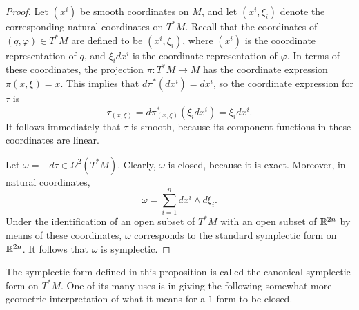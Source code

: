 \begin{proof}
Let $(x^i)$ be smooth coordinates on $M$, and let $(x^i,\xi_i)$ denote the corresponding natural coordinates on $T^*M$. Recall that the coordinates of $(q,\varphi)\in T^*M$ are defined to be $(x^i,\xi_i)$, where $(x^i)$ is the coordinate representation of $q$, and $\xi_idx^i$ is the coordinate representation of $\varphi$. In terms of these coordinates, the projection $\pi:T^*M\to M$ has the coordinate expression $\pi(x,\xi)=x$. This implies that $d\pi^*(dx^i)=dx^i$, so the coordinate expression for $\tau$ is
\[\tau_{(x,\xi)}=d\pi^*_{(x,\xi)}(\xi_idx^i)=\xi_idx^i.\]
It follows immediately that $\tau$ is smooth, because its component functions in these coordinates are linear.\par
Let $\omega=-d\tau\in\Omega^2(T^*M)$. Clearly, $\omega$ is closed, because it is exact. Moreover, in natural coordinates,
\[\omega=\sum_{i=1}^{n}dx^i\wedge d\xi_i.\]
Under the identification of an open subset of $T^*M$ with an open subset of $\mathbb{R}^{2n}$ by means of these coordinates, $\omega$ corresponds to the standard symplectic form on $\mathbb{R}^{2n}$. It follows that $\omega$ is symplectic.
\end{proof}

The symplectic form defined in this proposition is called the canonical symplectic form on $T^*M$. One of its many uses is in giving the following somewhat more geometric interpretation of what it means for a $1$-form to be closed.

